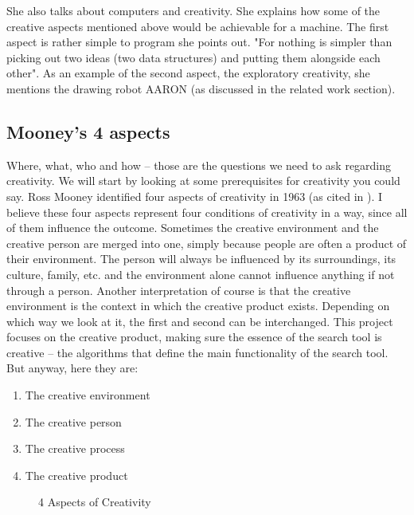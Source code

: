 She also talks about computers and creativity. She explains how some of the creative aspects mentioned above would be achievable for a machine.  The first aspect is rather simple to program she points out. "For nothing is simpler than picking out two ideas (two data structures) and putting them alongside each other". As an example of the second aspect, the exploratory creativity, she mentions the drawing robot AARON (as discussed in the related work section).

\subsection{Mooney's 4 aspects}

Where, what, who and how – those are the questions we need to ask regarding creativity. We will start by looking at some prerequisites for creativity you could say. Ross Mooney identified four aspects of creativity in 1963 (as cited in \citep{Sternberg1999}). I believe these four aspects represent four conditions of creativity in a way, since all of them influence the outcome. Sometimes the creative environment and the creative person are merged into one, simply because people are often a product of their environment. The person will always be influenced by its surroundings, its culture, family, etc. and the environment alone cannot influence anything if not through a person. Another interpretation of course is that the creative environment is the context in which the creative product exists. Depending on which way we look at it, the first and second can be interchanged. This project focuses on the creative product, making sure the essence of the search tool is creative – the algorithms that define the main functionality of the search tool. But anyway, here they are:

\begin{enumerate}
  \item The creative environment
  \item The creative person
  \item The creative process
  \item The creative product
\end{enumerate}

\begin{figure}[!htb] %
  \centering
  \tikzset{every fit/.append style=text badly centered}
\caption[4 Aspects of Creativity]{4 Aspects of Creativity}
\label{fig:4Crea}
\end{figure}

